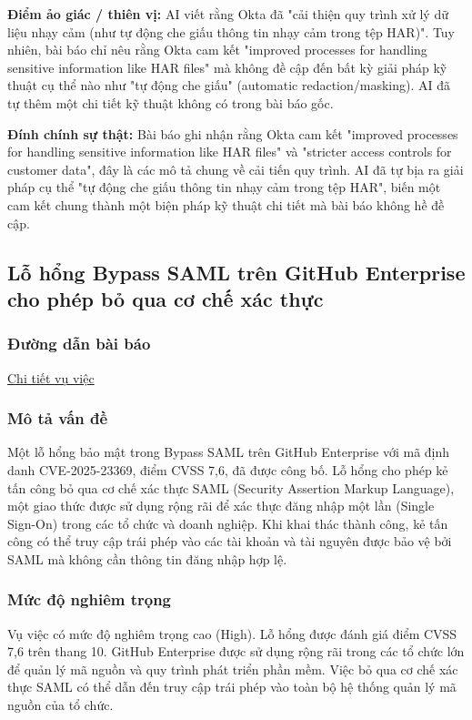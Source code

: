 \textbf{Điểm ảo giác / thiên vị:}
AI viết rằng Okta đã "cải thiện quy trình xử lý dữ liệu nhạy cảm (như tự động che giấu thông tin nhạy cảm trong tệp HAR)". Tuy nhiên, bài báo chỉ nêu rằng Okta cam kết "improved processes for handling sensitive information like HAR files" mà không đề cập đến bất kỳ giải pháp kỹ thuật cụ thể nào như "tự động che giấu" (automatic redaction/masking). AI đã tự thêm một chi tiết kỹ thuật không có trong bài báo gốc.

\textbf{Đính chính sự thật:}
Bài báo ghi nhận rằng Okta cam kết "improved processes for handling sensitive information like HAR files" và "stricter access controls for customer data", đây là các mô tả chung về cải tiến quy trình. AI đã tự bịa ra giải pháp cụ thể "tự động che giấu thông tin nhạy cảm trong tệp HAR", biến một cam kết chung thành một biện pháp kỹ thuật chi tiết mà bài báo không hề đề cập.

\subsection{Lỗ hổng Bypass SAML trên GitHub Enterprise cho phép bỏ qua cơ chế xác thực}

\subsubsection{Đường dẫn bài báo}
\href{https://www.nait.vn/attt/lo-hong-trong-bypass-saml-cho-phep-ke-tan-cong-bo-qua-co-che-xac-thuc-1578.html}{Chi tiết vụ việc}

\subsubsection{Mô tả vấn đề}
Một lỗ hổng bảo mật trong Bypass SAML trên GitHub Enterprise với mã định danh CVE-2025-23369, điểm CVSS 7,6, đã được công bố. Lỗ hổng cho phép kẻ tấn công bỏ qua cơ chế xác thực SAML (Security Assertion Markup Language), một giao thức được sử dụng rộng rãi để xác thực đăng nhập một lần (Single Sign-On) trong các tổ chức và doanh nghiệp. Khi khai thác thành công, kẻ tấn công có thể truy cập trái phép vào các tài khoản và tài nguyên được bảo vệ bởi SAML mà không cần thông tin đăng nhập hợp lệ.

\subsubsection{Mức độ nghiêm trọng}
Vụ việc có mức độ nghiêm trọng cao (High). Lỗ hổng được đánh giá điểm CVSS 7,6 trên thang 10. GitHub Enterprise được sử dụng rộng rãi trong các tổ chức lớn để quản lý mã nguồn và quy trình phát triển phần mềm. Việc bỏ qua cơ chế xác thực SAML có thể dẫn đến truy cập trái phép vào toàn bộ hệ thống quản lý mã nguồn của tổ chức.

